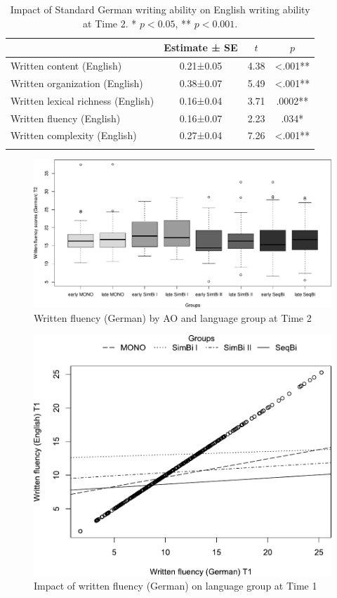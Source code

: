 \documentclass[output=paper,modfonts,nonflat,newtxmath]{langsci/langscibook}
\begin{document}
\begin{table}
\caption{\label{tab:pfenninger:11}Impact of Standard German writing ability on English writing ability at Time 2. * $p<0.05$, ** $p<0.001$.}
\begin{tabular}{lS[table-format=-1.3,parse-numbers=false]S[table-format=1.2]S[table-format=<1.4,table-space-text-post = ab]}
\lsptoprule
& {Estimate ± SE} & {$t$}  & {$p$}\\\midrule
Written content (English) & 0.21±0.05 & 4.38 & <.001**\\
Written organization (English) & 0.38±0.07 & 5.49 & <.001**\\
Written lexical richness (English) & 0.16±0.04 & 3.71 & .0002**\\
Written fluency (English) & 0.16±0.07 & 2.23 & .034*\\
Written complexity (English) & 0.27±0.04 & 7.26 & <.001**\\
\lspbottomrule
\end{tabular}
\end{table}

\begin{figure}%
\includegraphics[width=\textwidth]{figures/PfenningerFigure11.pdf}
\caption{\label{fig:pfenninger:11} Written fluency (German) by AO and language group at Time 2}
\end{figure}


\begin{figure}%
\includegraphics[width=.75\textwidth]{figures/PfenningerFigure7.pdf}
\caption{\label{fig:pfenninger:7}Impact of written fluency (German) on language group at Time 1}
\end{figure}
\end{document}
